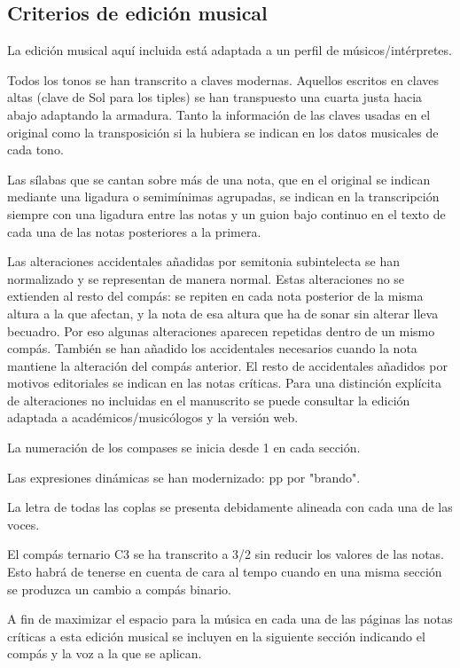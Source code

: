 \subsection*{Criterios de edición musical}
\noindent La edición musical aquí incluida está adaptada a un perfil de músicos/intérpretes.

\noindent Todos los tonos se han transcrito a claves modernas. Aquellos escritos en claves altas (clave de Sol para los tiples) se han transpuesto una cuarta justa hacia abajo adaptando la armadura. Tanto la información de las claves usadas en el original como la transposición si la hubiera se indican en los datos musicales de cada tono.

\noindent Las sílabas que se cantan sobre más de una nota, que en el original se indican mediante una ligadura o semimínimas agrupadas, se indican en la transcripción siempre con una ligadura entre las notas y un guion bajo continuo en el texto de cada una de las notas posteriores a la primera. 

\noindent Las alteraciones accidentales añadidas por semitonia subintelecta se han normalizado y se representan de manera normal. Estas alteraciones no se extienden al resto del compás: se repiten en cada nota posterior de la misma altura a la que afectan, y la nota de esa altura que ha de sonar sin alterar lleva becuadro. Por eso algunas alteraciones aparecen repetidas dentro de un mismo compás. También se han añadido los accidentales necesarios cuando la nota mantiene la alteración del compás anterior. El resto de accidentales añadidos por motivos editoriales se indican en las notas críticas. Para una distinción explícita de alteraciones no incluidas en el manuscrito se puede consultar la edición adaptada a académicos/musicólogos y la versión web. 

\noindent La numeración de los compases se inicia desde 1 en cada sección.

\noindent Las expresiones dinámicas se han modernizado: pp por "brando".

\noindent La letra de todas las coplas se presenta debidamente alineada con cada una de las voces. 

\noindent El compás ternario C3 se ha transcrito a 3/2 sin reducir los valores de las notas. Esto habrá de tenerse en cuenta de cara al tempo cuando en una misma sección se produzca un cambio a compás binario.

\noindent A fin de maximizar el espacio para la música en cada una de las páginas las notas críticas a esta edición musical se incluyen en la siguiente sección indicando el compás y la voz a la que se aplican. 


